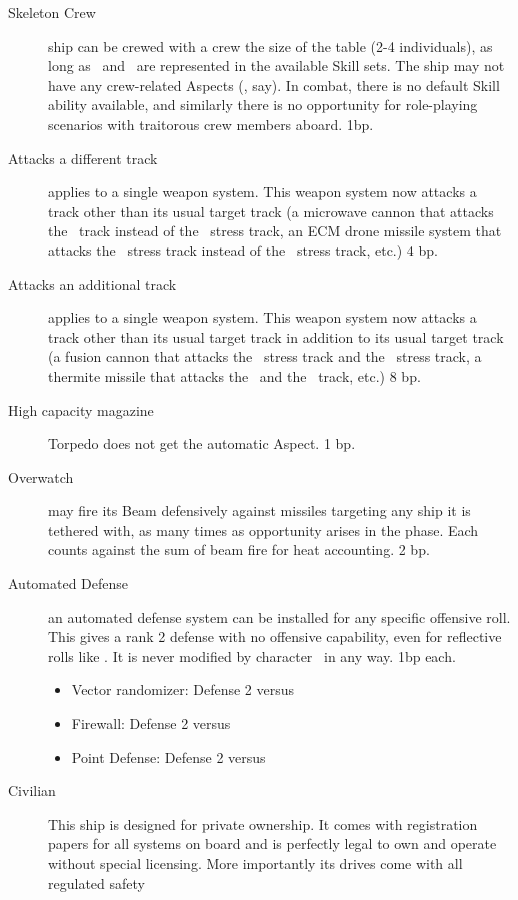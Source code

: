 \begin{description}
\item[Skeleton Crew]
ship can be crewed with a crew the size of the table (2-4 individuals), as
long as \Pilot\ and \Navigation\ are represented in the available Skill sets. The
ship may not have any crew-related Aspects (, say). In combat,
there is no default Skill ability available, and similarly there is no
opportunity for role-playing scenarios with traitorous crew members aboard.
1bp.
\item[Attacks a different track]
applies to a single weapon system. This weapon system now attacks a track
other than its usual target track (a microwave cannon that attacks the \Heat\
track instead of the \Frame\ stress track, an ECM drone missile system that
attacks the \Data\ stress track instead of the \Frame\ stress track, etc.) 4 bp.
\item[Attacks an additional track]
applies to a single weapon system. This weapon system now attacks a track
other than its usual target track in addition to its usual target track (a
fusion cannon that attacks the \Data\ stress track and the \Frame\ stress track, a
thermite missile that attacks the \Frame\ and the \Heat\ track, etc.) 8 bp.
\item [High capacity magazine]
Torpedo does not get the automatic  Aspect. 1 bp.
\item[Overwatch]
may fire its Beam defensively against missiles targeting any ship it is
tethered with, as many times as opportunity arises in the phase. Each counts
against the sum of beam fire for heat accounting. 2 bp.
\item[Automated Defense]
an automated defense system can be installed for any specific offensive roll.
This gives a rank 2 defense with no offensive capability, even for reflective
rolls like \EW. It is never modified by character \Skill\ in any way. 1bp each.
\begin{itemize}
\item Vector randomizer: Defense 2 versus \Beam
\item Firewall: Defense 2 versus \EW
\item Point Defense: Defense 2 versus \Torpedoes
\end{itemize}
\item[Civilian]
This ship is designed for private ownership. It comes with registration papers
for all systems on board and is perfectly legal to own and operate without
special licensing. More importantly its drives come with all regulated safety

\end{description}

